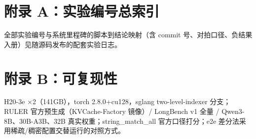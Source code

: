 \documentclass[11pt]{article}
\begin{document}
\section*{附录 A：实验编号总索引}
全部实验编号与系统里程碑的脚本到结论映射（含 commit 号、对拍口径、负结果入册）见随源码发布的配套实验日志。

\section*{附录 B：可复现性}
H20-3e $\times$2（141GB），torch 2.8.0+cu128，sglang two-level-indexer 分支；RULER 官方预生成（KVCache-Factory 镜像）/ LongBench v1 全量 / Qwen3-8B、30B-A3B、32B 真实权重；string\_match\_all 官方口径打分；e2e 差分法采用稀疏/稠密配置交替运行的对照方式。

\end{document}
